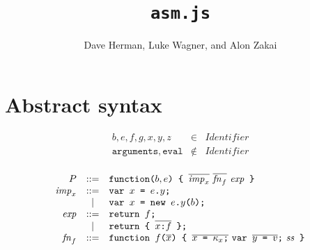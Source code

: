 \documentclass{article}
\newcommand{\funcall}[2]{{#1}\mathjs{(}{#2}\mathjs{)}}
\newcommand{\paren}[1]{\mathjs{(}{#1}\mathjs{)}}
\newcommand{\seq}[1]{\overline{{#1}}}
\newcommand{\mathjs}[1]{\mbox{\texttt{{#1}}}}
\newcommand{\return}[1]{\mathjs{return }{#1}\mathjs{;}}
\newcommand{\fun}[3]{\mathjs{function }{#1}\mathjs{(}{#2}\mathjs{) \{ }{#3}\mathjs{ \}}}
\newcommand{\var}[1]{\mathjs{var }{#1}\mathjs{;}}
\newcommand{\function}{\mathtt{function}}
\begin{document}
\title{\texttt{asm.js}}
\author{Dave Herman, Luke Wagner, and Alon Zakai}
\maketitle

\section{Abstract syntax}

\[
\begin{array}{rcl}
b, e, f, g, x, y, z               & \in & \mathit{Identifier} \\
\mathtt{arguments}, \mathtt{eval} & \not\in & \mathit{Identifier} \\
\end{array}
\]

\[
\begin{array}{rcl}
P               & ::= & \function\paren{b, e}\mathjs{ \{ } \seq{\mathit{imp}_x}\ \seq{\mathit{fn}_f}\ \mathit{exp}\mathjs{ \}} \\
\mathit{imp}_x  & ::= & \var{x \mathjs{ = } e\mathjs{.}y} \\
                &  |  & \var{x \mathjs{ = } \mathjs{new }\funcall{e\mathjs{.}y}{b}} \\
\mathit{exp}    & ::= & \return{f} \\
                &  |  & \return{\mathjs{\{ } \seq{x \mathjs{:} f} \mathjs{ \}}} \\
\mathit{fn}_f   & ::= & \fun{f}{\seq{x}}{\seq{x\mathjs{ = }\kappa_x\mathjs{;}}\ \var{\seq{y\mathjs{ = }v}}\ \mathit{ss}} \\
\end{array}
\]
\end{document}

